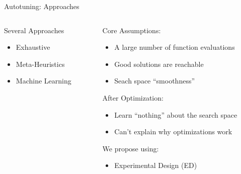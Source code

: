 \documentclass[10pt, compress, aspectratio=169, xcolor={table,usenames,dvipsnames}]{beamer}
\begin{document}
\begin{frame}[label={sec:orgd9d8f49}]{Autotuning: Approaches}
\begin{columns}
\begin{column}{0.5\columnwidth}
\begin{block}{Several Approaches}
\footnotesize
\begin{itemize}
\item \colorbox{red!25}{Exhaustive}
\item \colorbox{green!25}{Meta-Heuristics}
\item \colorbox{cyan!25}{Machine Learning}
\end{itemize}
\normalsize

\vspace{-.4cm}


\end{block}
\end{column}

\begin{column}{0.5\columnwidth}
\begin{block}{Core Assumptions:}
\begin{itemize}
\item A large number of function evaluations
\item Good solutions are reachable
\item Seach space ``smoothness''
\end{itemize}
\begin{block}{After Optimization:}
\begin{itemize}
\item \alert{Learn ``nothing''} about the search space
\item \alert{Can't explain} why optimizations work
\end{itemize}
\end{block}
\begin{block}{We propose using:}
\begin{itemize}
\item \alert{Experimental Design} (\alert{ED})
\end{itemize}
\end{block}
\end{block}
\end{column}
\end{columns}
\end{frame}
\end{document}
